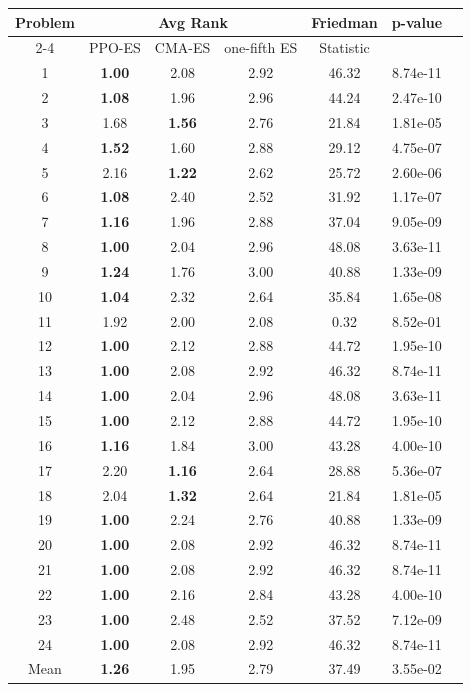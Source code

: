 
        \begin{tabular}{ccccccc}
        \toprule
        \multirow{2}{*}{Problem} & \multicolumn{3}{c}{Avg Rank} & Friedman & \multirow{2}{*}{p-value} \\
        \cline{2-4}
        & PPO-ES & CMA-ES & one-fifth ES & Statistic & \\
        \midrule
        1 & \textbf{1.00} & 2.08 & 2.92 & 46.32 & 8.74e-11 \\
2 & \textbf{1.08} & 1.96 & 2.96 & 44.24 & 2.47e-10 \\
3 & 1.68 & \textbf{1.56} & 2.76 & 21.84 & 1.81e-05 \\
4 & \textbf{1.52} & 1.60 & 2.88 & 29.12 & 4.75e-07 \\
5 & 2.16 & \textbf{1.22} & 2.62 & 25.72 & 2.60e-06 \\
6 & \textbf{1.08} & 2.40 & 2.52 & 31.92 & 1.17e-07 \\
7 & \textbf{1.16} & 1.96 & 2.88 & 37.04 & 9.05e-09 \\
8 & \textbf{1.00} & 2.04 & 2.96 & 48.08 & 3.63e-11 \\
9 & \textbf{1.24} & 1.76 & 3.00 & 40.88 & 1.33e-09 \\
10 & \textbf{1.04} & 2.32 & 2.64 & 35.84 & 1.65e-08 \\
11 & 1.92 & 2.00 & 2.08 & 0.32 & 8.52e-01 \\
12 & \textbf{1.00} & 2.12 & 2.88 & 44.72 & 1.95e-10 \\
13 & \textbf{1.00} & 2.08 & 2.92 & 46.32 & 8.74e-11 \\
14 & \textbf{1.00} & 2.04 & 2.96 & 48.08 & 3.63e-11 \\
15 & \textbf{1.00} & 2.12 & 2.88 & 44.72 & 1.95e-10 \\
16 & \textbf{1.16} & 1.84 & 3.00 & 43.28 & 4.00e-10 \\
17 & 2.20 & \textbf{1.16} & 2.64 & 28.88 & 5.36e-07 \\
18 & 2.04 & \textbf{1.32} & 2.64 & 21.84 & 1.81e-05 \\
19 & \textbf{1.00} & 2.24 & 2.76 & 40.88 & 1.33e-09 \\
20 & \textbf{1.00} & 2.08 & 2.92 & 46.32 & 8.74e-11 \\
21 & \textbf{1.00} & 2.08 & 2.92 & 46.32 & 8.74e-11 \\
22 & \textbf{1.00} & 2.16 & 2.84 & 43.28 & 4.00e-10 \\
23 & \textbf{1.00} & 2.48 & 2.52 & 37.52 & 7.12e-09 \\
24 & \textbf{1.00} & 2.08 & 2.92 & 46.32 & 8.74e-11 \\
\midrule
Mean & \textbf{1.26} & 1.95 & 2.79 & 37.49 & 3.55e-02 \\
\bottomrule
\end{tabular}